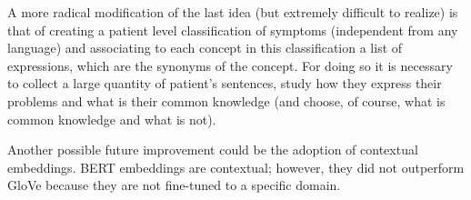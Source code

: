 A more radical modification of the last idea (but extremely difficult to realize) is that of creating a patient level classification of symptoms (independent from any language) and associating to each concept in this classification a list of expressions, which are the synonyms of the concept. For doing so it is necessary to collect a large quantity of patient's sentences, study how they express their problems and what is their common knowledge (and choose, of course, what is common knowledge and what is not).

Another possible future improvement could be the adoption of contextual embeddings. BERT embeddings are contextual; however, they did not outperform GloVe because they are not fine-tuned to a specific domain.



